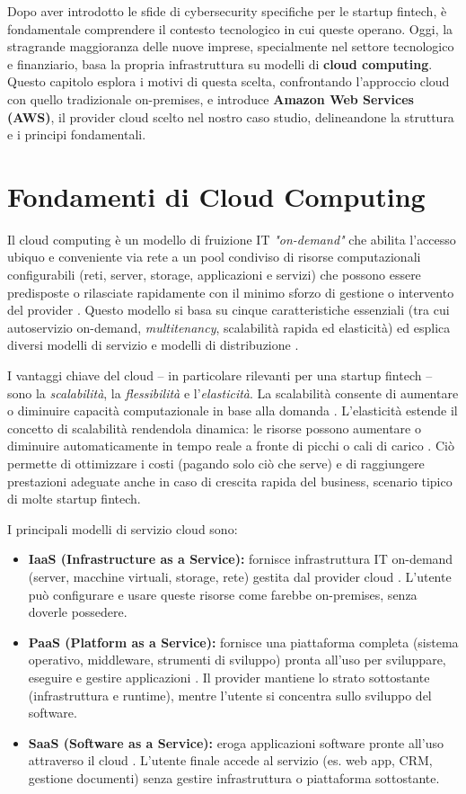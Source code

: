 Dopo aver introdotto le sfide di cybersecurity specifiche per le startup fintech, è fondamentale comprendere il contesto tecnologico in cui queste operano. Oggi, la stragrande maggioranza delle nuove imprese, specialmente nel settore tecnologico e finanziario, basa la propria infrastruttura su modelli di \textbf{cloud computing}. Questo capitolo esplora i motivi di questa scelta, confrontando l'approccio cloud con quello tradizionale on-premises, e introduce \textbf{Amazon Web Services (AWS)}, il provider cloud scelto nel nostro caso studio, delineandone la struttura e i principi fondamentali.
\section{Fondamenti di Cloud Computing}
Il cloud computing è un modello di fruizione IT \textit{"on-demand"} che abilita l'accesso ubiquo e conveniente via rete a un pool condiviso di risorse computazionali configurabili (reti, server, storage, applicazioni e servizi) che possono essere predisposte o rilasciate rapidamente con il minimo sforzo di gestione o intervento del provider \cite{nist800-145}. Questo modello si basa su cinque caratteristiche essenziali (tra cui autoservizio on-demand, \textit{multitenancy}, scalabilità rapida ed elasticità) ed esplica diversi modelli di servizio e modelli di distribuzione \cite{nist800-145}.

I vantaggi chiave del cloud – in particolare rilevanti per una startup fintech – sono la \textit{scalabilità}, la \textit{flessibilità} e l'\textit{elasticità}. La scalabilità consente di aumentare o diminuire capacità computazionale in base alla domanda \cite{digitalocean-cloud}. L'elasticità estende il concetto di scalabilità rendendola dinamica: le risorse possono aumentare o diminuire automaticamente in tempo reale a fronte di picchi o cali di carico \cite{geeksforgeeks_scalability}. Ciò permette di ottimizzare i costi (pagando solo ciò che serve) e di raggiungere prestazioni adeguate anche in caso di crescita rapida del business, scenario tipico di molte startup fintech.

I principali modelli di servizio cloud sono:
\begin{itemize}
    \item \textbf{IaaS (Infrastructure as a Service):} fornisce infrastruttura IT on-demand (server, macchine virtuali, storage, rete) gestita dal provider cloud \cite{ibm_iaas}. L'utente può configurare e usare queste risorse come farebbe on-premises, senza doverle possedere.
    \item \textbf{PaaS (Platform as a Service):} fornisce una piattaforma completa (sistema operativo, middleware, strumenti di sviluppo) pronta all'uso per sviluppare, eseguire e gestire applicazioni \cite{ibm-cloud}. Il provider mantiene lo strato sottostante (infrastruttura e runtime), mentre l'utente si concentra sullo sviluppo del software.
    \item \textbf{SaaS (Software as a Service):} eroga applicazioni software pronte all’uso attraverso il cloud \cite{ibm-cloud}. L’utente finale accede al servizio (es. web app, CRM, gestione documenti) senza gestire infrastruttura o piattaforma sottostante.
\end{itemize}

